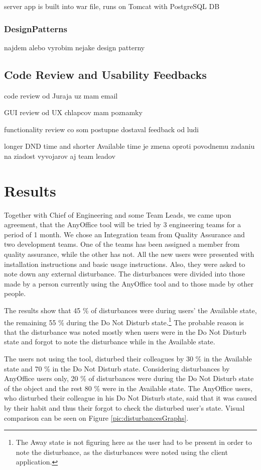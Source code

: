 \documentclass[11pt,singleside]{myfithesis2}
\begin{document}
server app is built into war file, runs on Tomcat with PostgreSQL DB


		\subsection{DesignPatterns}
najdem alebo vyrobim nejake design patterny

	
	\section{Code Review and Usability Feedbacks}

code review od Juraja uz mam email

GUI review od UX chlapcov mam poznamky

functionality review co som postupne dostaval feedback od ludi

longer DND time and shorter Available time je zmena oproti povodnemu zadaniu na ziadost vyvojarov aj team leadov


\chapter{Results}\label{results}
Together with Chief of Engineering and some Team Leads, we came upon agreement, that the AnyOffice tool will be tried by 3 engineering teams for a period of 1 month. We chose an Integration team from Quality Assurance and two development teams. One of the teams has been assigned a member from quality assurance, while the other has not. All the new users were presented with installation instructions and basic usage instructions. Also, they were asked to note down any external disturbance. The disturbances were divided into those made by a person currently using the AnyOffice tool and to those made by other people.

The results show that 45 \% of disturbances were during users' the Available state, the remaining 55 \% during the Do Not Disturb state.\footnote{The Away state is not figuring here as the user had to be present in order to note the disturbance, as the disturbances were noted using the client application.} The probable reason is that the disturbance was noted mostly when users were in the Do Not Disturb state and forgot to note the disturbance while in the Available state.

The users not using the tool, disturbed their colleagues by 30 \% in the Available state and 70 \% in the Do Not Disturb state. Considering disturbances by AnyOffice users only, 20 \% of disturbances were during the Do Not Disturb state of the object and the rest 80 \% were in the Available state. The AnyOffice users, who disturbed their colleague in his Do Not Disturb state, said that it was caused by their habit and thus their forgot to check the disturbed user's state. Visual comparison can be seen on Figure \ref{pic:disturbancesGraphs}.
\end{document}
